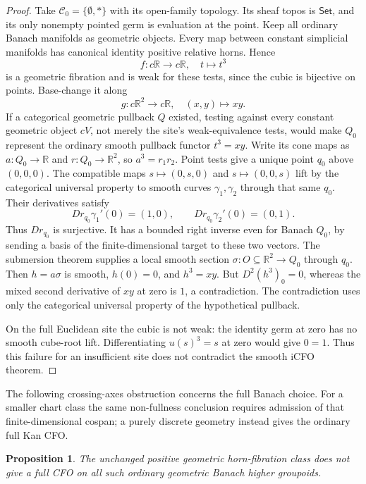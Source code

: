 \documentclass[12pt]{amsart}
\newtheorem{prop}[thm]{Proposition}
\theoremstyle{definition}
\theoremstyle{remark}
\numberwithin{equation}{section}
\newcommand{\R}{\mathbb R}
\newcommand{\Set}{\mathsf{Set}}
\begin{document}
\begin{proof}
Take $\mathcal C_0=\{\emptyset,*\}$ with its open-family
topology. Its sheaf topos is $\Set$, and its only
nonempty pointed germ is evaluation at the point.
Keep all ordinary Banach manifolds as geometric objects.
Every map between constant simplicial manifolds has
canonical identity positive relative horns. Hence
\[
 f:c\R\longrightarrow c\R,\quad t\longmapsto t^3
\]
is a geometric fibration and is weak for these tests,
since the cubic is bijective on points.
Base-change it along
\[
 g:c\R^2\longrightarrow c\R,\quad (x,y)\longmapsto xy.
\]
If a categorical geometric pullback $Q$ existed,
testing against every constant geometric object $cV$,
not merely the site's weak-equivalence tests, would
make $Q_0$ represent the ordinary smooth pullback
functor $t^3=xy$. Write its cone maps as
$a:Q_0\to\R$ and $r:Q_0\to\R^2$, so $a^3=r_1r_2$.
Point tests give a unique point $q_0$ above $(0,0,0)$.
The compatible maps $s\mapsto(0,s,0)$ and
$s\mapsto(0,0,s)$ lift by the categorical universal
property to smooth curves $\gamma_1,\gamma_2$ through
that same $q_0$. Their derivatives satisfy
\[
 Dr_{q_0}\gamma_1'(0)=(1,0),\qquad
 Dr_{q_0}\gamma_2'(0)=(0,1).
\]
Thus $Dr_{q_0}$ is surjective. It has a bounded right
inverse even for Banach $Q_0$, by sending a basis
of the finite-dimensional target to these two vectors.
The submersion theorem supplies a local smooth section
$\sigma:O\subseteq\R^2\to Q_0$ through $q_0$.
Then $h=a\sigma$ is smooth, $h(0)=0$, and $h^3=xy$.
But $D^2(h^3)_0=0$, whereas the mixed second
derivative of $xy$ at zero is $1$, a contradiction.
The contradiction uses only the categorical universal
property of the hypothetical pullback.

On the full Euclidean site the cubic is not weak:
the identity germ at zero has no smooth cube-root
lift. Differentiating $u(s)^3=s$ at zero would give
$0=1$. Thus this failure for an insufficient site
does not contradict the smooth iCFO theorem.
\end{proof}

The following crossing-axes obstruction concerns the full
Banach choice. For a smaller chart class the same
non-fullness conclusion requires admission of that
finite-dimensional cospan; a purely discrete geometry
instead gives the ordinary full Kan CFO.

\begin{prop}\label{prop:ordinary-banach-obstruction}
The unchanged positive geometric horn-fibration
class does not give a full CFO on all such
ordinary geometric Banach higher groupoids.
\end{prop}
\end{document}
